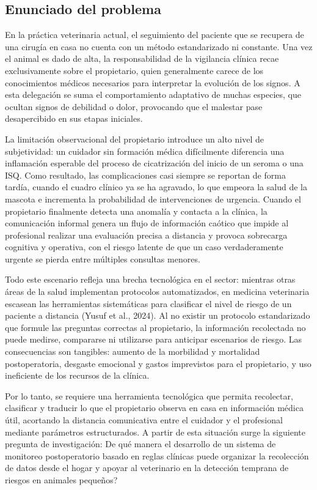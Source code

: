 \documentclass[stu, spanish]{apa7}
\begin{document}
\subsection{Enunciado del problema}
En la pr\'{a}ctica veterinaria actual, el seguimiento del paciente que se recupera de una cirug\'{i}a en casa no cuenta con un m\'{e}todo estandarizado ni constante. Una vez el animal es dado de alta, la responsabilidad de la vigilancia cl\'{i}nica recae exclusivamente sobre el propietario, quien generalmente carece de los conocimientos m\'{e}dicos necesarios para interpretar la evoluci\'{o}n de los signos. A esta delegaci\'{o}n se suma el comportamiento adaptativo de muchas especies, que ocultan signos de debilidad o dolor, provocando que el malestar pase desapercibido en sus etapas iniciales.

La limitaci\'{o}n observacional del propietario introduce un alto nivel de subjetividad: un cuidador sin formaci\'{o}n m\'{e}dica dif\'{i}cilmente diferencia una inflamaci\'{o}n esperable del proceso de cicatrizaci\'{o}n del inicio de un seroma o una ISQ. Como resultado, las complicaciones casi siempre se reportan de forma tard\'{i}a, cuando el cuadro cl\'{i}nico ya se ha agravado, lo que empeora la salud de la mascota e incrementa la probabilidad de intervenciones de urgencia. Cuando el propietario finalmente detecta una anomal\'{i}a y contacta a la cl\'{i}nica, la comunicaci\'{o}n informal genera un flujo de informaci\'{o}n ca\'{o}tico que impide al profesional realizar una evaluaci\'{o}n precisa a distancia y provoca sobrecarga cognitiva y operativa, con el riesgo latente de que un caso verdaderamente urgente se pierda entre m\'{u}ltiples consultas menores.

Todo este escenario refleja una brecha tecnol\'{o}gica en el sector: mientras otras \'{a}reas de la salud implementan protocolos automatizados, en medicina veterinaria escasean las herramientas sistem\'{a}ticas para clasificar el nivel de riesgo de un paciente a distancia (Yusuf et al., 2024). Al no existir un protocolo estandarizado que formule las preguntas correctas al propietario, la informaci\'{o}n recolectada no puede medirse, compararse ni utilizarse para anticipar escenarios de riesgo. Las consecuencias son tangibles: aumento de la morbilidad y mortalidad postoperatoria, desgaste emocional y gastos imprevistos para el propietario, y uso ineficiente de los recursos de la cl\'{i}nica.

Por lo tanto, se requiere una herramienta tecnol\'{o}gica que permita recolectar, clasificar y traducir lo que el propietario observa en casa en informaci\'{o}n m\'{e}dica \'{u}til, acortando la distancia comunicativa entre el cuidador y el profesional mediante par\'{a}metros estructurados. A partir de esta situaci\'{o}n surge la siguiente pregunta de investigaci\'{o}n: \textquestiondown De qu\'{e} manera el desarrollo de un sistema de monitoreo postoperatorio basado en reglas cl\'{i}nicas puede organizar la recolecci\'{o}n de datos desde el hogar y apoyar al veterinario en la detecci\'{o}n temprana de riesgos en animales peque\~{n}os?
\end{document}
